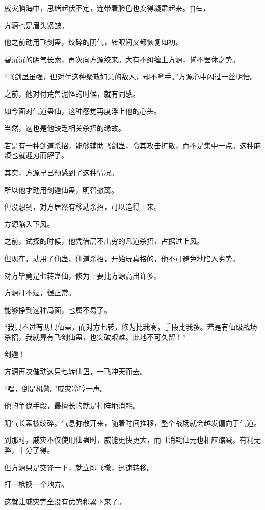 
\begin{this_body}

戚灾脑海中，思绪起伏不定，连带着脸色也变得凝肃起来。∏∈，

方源也是眉头紧皱。

他之前动用飞剑蛊，绞碎的阴气，转眼间又都恢复如初。

碧沉沉的阴气长索，再次向方源绞来。大有不纠缠上方源，誓不罢休之势。

“飞剑蛊虽强，但对付这种聚散如意的敌人，却不拿手。”方源心中闪过一丝明悟。

之前，他对付荒兽泥怪的时候，就有同感。

如今面对气道蛊仙，这种感觉再度浮上他的心头。

当然，这也是他缺乏相关杀招的缘故。

若是有一种剑道杀招，能够辅助飞剑蛊，令其攻击扩散，而不是集中一点。这种麻烦也就迎刃而解了。

其实，方源早已预感到了这种情况。

所以他才动用剑遁仙蛊，明智撤离。

但没想到，对方居然有移动杀招，可以追得上来。

方源陷入下风。

之前，试探的时候，他凭借层不出穷的凡道杀招，占据过上风。

但现在，动用了仙蛊、仙道杀招，开始玩真格的，他不可避免地陷入劣势。

对方毕竟是七转蛊仙，修为上要比方源高出许多。

方源打不过，很正常。

能够挣到这种局面，也属不易了。

“我只不过有两只仙蛊，而对方七转，修为比我高，手段比我多。若是有仙级战场杀招，我就算有飞剑仙蛊，也突破艰难。此地不可久留！”

剑遁！

方源再次催动这只七转仙蛊，一飞冲天而去。

“嘿，倒是机警。”戚灾冷哼一声。

他的争伐手段，最擅长的就是打阵地消耗。

阴气长索被绞碎。气息弥散开来，随着时间推移，整个战场就会越发偏向于气道。

到那时，戚灾不仅使用仙蛊时，威能更快更大，而且消耗仙元也相应缩减。有利无弊，十分了得。

但方源只是交锋一下，就立即飞撤，迅速转移。

打一枪换一个地方。

这就让戚灾完全没有优势积累下来了。


\end{this_body}
